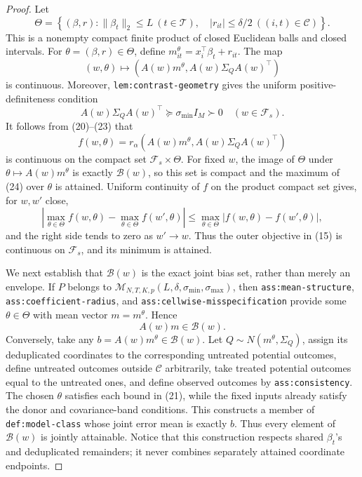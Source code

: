 \documentclass{article}
\begin{document}
\begin{proof}
Let
\[
 \Theta=\left\{(\beta,r):
 \lVert\beta_t\rVert_2\leq L\ (t\in\mathcal T),\quad
 |r_{it}|\leq\delta/2\ ((i,t)\in\mathcal C)\right\}. \tag{21}
\]
This is a nonempty compact finite product of closed Euclidean balls and
closed intervals.  For \(\theta=(\beta,r)\in\Theta\), define
\(m^\theta_{it}=x_i^{\top}\beta_t+r_{it}\).  The map
\[
 (w,\theta)\longmapsto
 \left(A(w)m^\theta,A(w)\Sigma_QA(w)^{\top}\right) \tag{22}
\]
is continuous.  Moreover, \texttt{lem:contrast-geometry} gives the uniform
positive-definiteness condition
\[
 A(w)\Sigma_QA(w)^{\top}\succeq\sigma_{\min}I_M\succ0
 \quad(w\in\mathcal F_s). \tag{23}
\]
It follows from (20)--(23) that
\[
 f(w,\theta)=r_\alpha\!\left(
 A(w)m^\theta,A(w)\Sigma_QA(w)^{\top}\right) \tag{24}
\]
is continuous on the compact set \(\mathcal F_s\times\Theta\).
For fixed \(w\), the image of \(\Theta\) under
\(\theta\mapsto A(w)m^\theta\) is exactly \(\mathcal B(w)\), so this set
is compact and the maximum of (24) over \(\theta\) is attained.  Uniform
continuity of \(f\) on the product compact set gives, for \(w,w'\) close,
\[
 \left|\max_{\theta\in\Theta}f(w,\theta)
       -\max_{\theta\in\Theta}f(w',\theta)\right|
 \leq\max_{\theta\in\Theta}|f(w,\theta)-f(w',\theta)|, \tag{25}
\]
and the right side tends to zero as \(w'\to w\).  Thus the outer objective
in (15) is continuous on \(\mathcal F_s\), and its minimum is attained.

We next establish that \(\mathcal B(w)\) is the exact joint bias set, rather
than merely an envelope.  If \(P\) belongs to
\(\mathcal M_{N,T,K,p}(L,\delta,\sigma_{\min},\sigma_{\max})\), then
\texttt{ass:mean-structure}, \texttt{ass:coefficient-radius}, and
\texttt{ass:cellwise-misspecification} provide some \(\theta\in\Theta\)
with mean vector \(m=m^\theta\).  Hence
\[
 A(w)m\in\mathcal B(w). \tag{26}
\]
Conversely, take any \(b=A(w)m^\theta\in\mathcal B(w)\).  Let
\(Q\sim N(m^\theta,\Sigma_Q)\), assign its deduplicated coordinates to the
corresponding untreated potential outcomes, define untreated outcomes outside
\(\mathcal C\) arbitrarily, take treated potential outcomes equal to the
untreated ones, and define observed outcomes by
\texttt{ass:consistency}.  The chosen \(\theta\) satisfies each bound in
(21), while the fixed inputs already satisfy the donor and covariance-band
conditions.  This constructs a member of \texttt{def:model-class} whose
joint error mean is exactly \(b\).  Thus every element of \(\mathcal B(w)\)
is jointly attainable.  Notice that this construction respects shared
\(\beta_t\)'s and deduplicated remainders; it never combines separately
attained coordinate endpoints.


\end{proof}
\end{document}
